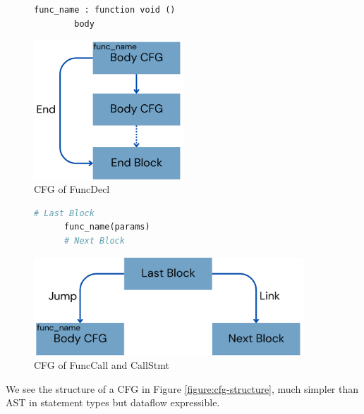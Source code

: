 \begin{figure}
  \centering
  \begin{minipage}{0.45\textwidth}
    \begin{lstlisting}[language=python]
      func_name : function void ()
        body
      \end{lstlisting}
  \end{minipage}%
  \hfill
  \begin{minipage}{0.45\textwidth}
    \centering
    \includegraphics[width=0.5\textwidth]{img/funcdecl-cfg.png}
  \end{minipage}
  \caption{CFG of FuncDecl}
\end{figure}


\begin{figure}[ht]
  \centering
  \centering
  \begin{minipage}{0.45\textwidth}
    \begin{lstlisting}[language=python]
      # Last Block
      func_name(params)
      # Next Block
      \end{lstlisting}
  \end{minipage}%
  \hfill
  \begin{minipage}{0.45\textwidth}
    \centering
    \includegraphics[width=0.9\textwidth]{img/call-cfg.png}
  \end{minipage}
  \caption{CFG of FuncCall and CallStmt}
\end{figure}

We see the structure of a CFG in Figure \ref{figure:cfg-structure}, much simpler than AST in statement types but dataflow expressible.

